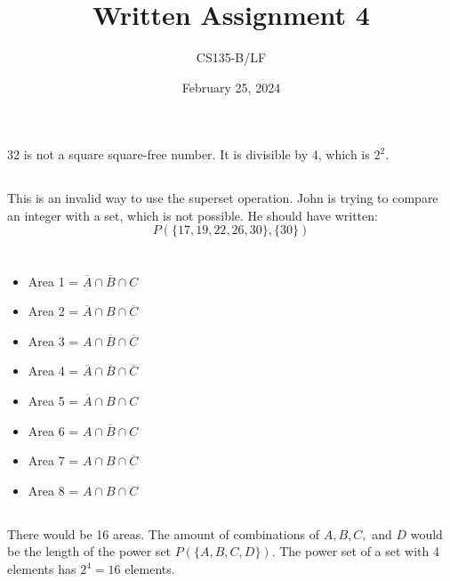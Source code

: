 \documentclass{article}
\title{Written Assignment 4}
\author{CS135-B/LF}
\date{February 25, 2024}
\begin{document}
\maketitle

\section{}
\subsection{}
32 is not a square square-free number. It is divisible by 4, which is $ 2^2 $. 

\subsection{}
This is an invalid way to use the superset operation. John is trying to compare an integer with a set, which is not possible. He should have written:
\begin{equation*}
P (\{17, 19, 22, 26, 30\}, \{30\})
\end{equation*}


\section{}
\subsection{}
\begin{itemize}
\item Area 1 = $ \overline{A} \cap \overline{B} \cap C  $
\item Area 2 = $ \overline{A} \cap B \cap \overline{C}  $ 	
\item Area 3 = $ A \cap \overline{B} \cap \overline{C}  $
\item Area 4 = $ \overline{A} \cap \overline{B} \cap \overline{C}$
\item Area 5 = $ \overline{A} \cap B \cap C  $ 
\item Area 6 = $ A \cap \overline{B} \cap C  $
\item Area 7 = $ A \cap B \cap \overline{C}  $
\item Area 8 = $ A \cap B \cap C $
\end{itemize}

\subsection{}
There would be 16 areas. The amount of combinations of $A, B, C,$ and $D$ would be the length of the power set $P ( \{ A, B, C, D \} )$. The power set of a set with 4 elements has $2^4 = 16$ elements.
\end{document}
